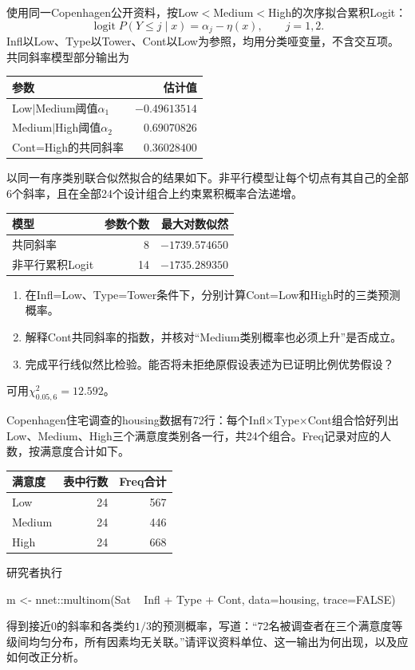 \par\noindent\begin{minipage}{\linewidth}
使用同一Copenhagen公开资料，按Low$<$Medium$<$High的次序拟合累积Logit：\[\operatorname{logit}P(Y\le j\mid x)=\alpha_j-\eta(x),\qquad j=1,2.\]Infl以Low、Type以Tower、Cont以Low为参照，均用分类哑变量，不含交互项。共同斜率模型部分输出为\begin{center}\begin{tabular}{lr}\toprule 参数&估计值\\\midrule Low$|$Medium阈值$\alpha_1$&$-0.49613514$\\Medium$|$High阈值$\alpha_2$&$0.69070826$\\Cont=High的共同斜率&$0.36028400$\\\bottomrule \end{tabular}\end{center}以同一有序类别联合似然拟合的结果如下。非平行模型让每个切点有其自己的全部6个斜率，且在全部24个设计组合上约束累积概率合法递增。\begin{center}\begin{tabular}{lrr}\toprule 模型&参数个数&最大对数似然\\\midrule 共同斜率&8&$-1739.574650$\\非平行累积Logit&14&$-1735.289350$\\\bottomrule \end{tabular}\end{center}\begin{enumerate}\item 在Infl=Low、Type=Tower条件下，分别计算Cont=Low和High时的三类预测概率。\item 解释Cont共同斜率的指数，并核对“Medium类别概率也必须上升”是否成立。\item 完成平行线似然比检验。能否将未拒绝原假设表述为已证明比例优势假设？\end{enumerate}可用$\chi^2_{0.05,6}=12.592$。
\end{minipage}\par\medskip

Copenhagen住宅调查的housing数据有72行：每个Infl$\times$Type$\times$Cont组合恰好列出Low、Medium、High三个满意度类别各一行，共24个组合。Freq记录对应的人数，按满意度合计如下。\begin{center}\begin{tabular}{lrr}\toprule 满意度&表中行数&Freq合计\\\midrule Low&24&567\\Medium&24&446\\High&24&668\\\bottomrule \end{tabular}\end{center}研究者执行
\begin{rcode}
m <- nnet::multinom(Sat ~ Infl + Type + Cont,
                    data=housing, trace=FALSE)
\end{rcode}
得到接近0的斜率和各类约$1/3$的预测概率，写道：“72名被调查者在三个满意度等级间均匀分布，所有因素均无关联。”请评议资料单位、这一输出为何出现，以及应如何改正分析。

